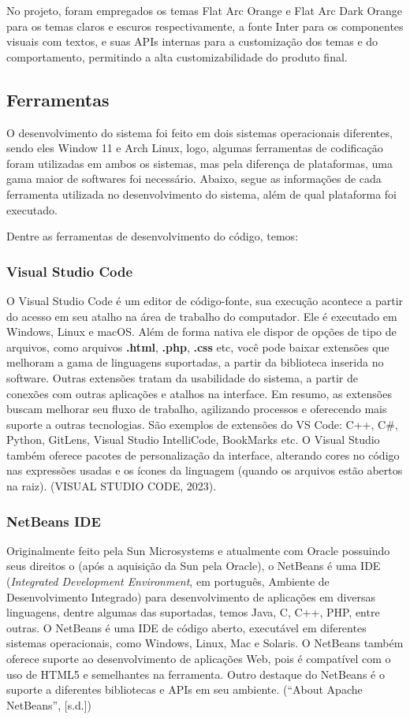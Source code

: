 \documentclass[a4paper,12pt]{article}
\begin{document}
No projeto, foram empregados os temas Flat Arc Orange e Flat Arc Dark Orange para os temas claros e escuros respectivamente, a fonte Inter para os componentes visuais com textos, e suas APIs internas para a customização dos temas e do comportamento, permitindo a alta customizabilidade do produto final.

\subsection{Ferramentas}
O desenvolvimento do sistema foi feito em dois sistemas operacionais diferentes, sendo eles Window 11 e Arch Linux, logo, algumas ferramentas 
de codificação foram utilizadas em ambos os sistemas, mas pela diferença de plataformas, uma gama maior de softwares foi necessário. Abaixo, segue 
as informações de cada ferramenta utilizada no desenvolvimento do sistema, além de qual plataforma foi executado.

Dentre as ferramentas de desenvolvimento do código, temos:
\subsubsection{Visual Studio Code}
O Visual Studio Code é um editor de código-fonte, sua execução acontece a partir do acesso em seu atalho na área de trabalho do computador. 
Ele é executado em Windows, Linux e macOS. Além de forma nativa ele dispor de opções de tipo de arquivos, como arquivos \textbf{.html}, \textbf{.php}, \textbf{.css} etc, 
você pode baixar extensões que melhoram a gama de linguagens suportadas, a partir da biblioteca inserida no software. Outras extensões tratam da 
usabilidade do sistema, a partir de conexões com outras aplicações e atalhos na interface. Em resumo, as extensões buscam melhorar seu fluxo de 
trabalho, agilizando processos e oferecendo mais suporte a outras tecnologias. São exemplos de extensões do VS Code: C++, C\#, Python, GitLens, 
Visual Studio IntelliCode, BookMarks etc. O Visual Studio também oferece pacotes de personalização da interface, alterando cores no código nas 
expressões usadas e os ícones da linguagem (quando os arquivos estão abertos na raiz). (VISUAL STUDIO CODE, 2023).

\subsubsection{NetBeans IDE}
Originalmente feito pela Sun Microsystems e atualmente com Oracle possuindo seus direitos o (após a aquisição da Sun pela Oracle), o NetBeans é uma 
IDE (\textit{Integrated Development Environment}, em português, Ambiente de Desenvolvimento Integrado) para desenvolvimento de aplicações em 
diversas linguagens, dentre algumas das suportadas, temos Java, C, C++, PHP, entre outras. O NetBeans é uma IDE de código aberto, executável 
em diferentes sistemas operacionais, como Windows, Linux, Mac e Solaris. O NetBeans também oferece suporte ao desenvolvimento de aplicações Web, 
pois é compatível com o uso de HTML5 e semelhantes na ferramenta. Outro destaque do NetBeans é o suporte a diferentes bibliotecas e APIs 
em seu ambiente. (“About Apache NetBeans”, [s.d.])
\end{document}
